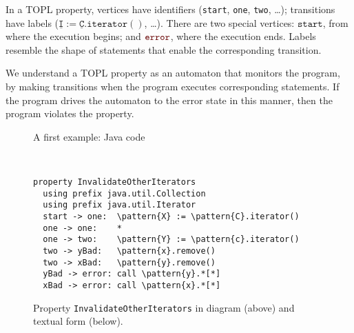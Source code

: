\documentclass[10pt, preprint]{sigplanconf} %
\newcommand{\error}{\ensuremath{\textcolor{darkred}{\mathtt{error}}}\xspace}
\newcommand{\pattern}[1]{\ensuremath{\mathtt{\underline{#1}}}}
\newcommand{\start}{\ensuremath{\mathtt{start}}\xspace}
\begin{document}
In a TOPL property, vertices have identifiers (\texttt{start}, \texttt{one}, \texttt{two}, \dots);
transitions have labels ($\pattern I:=\pattern C.\mathtt{iterator}()$, \dots).
There are two special vertices: \start, from where the execution begins; and \error, where the execution ends.
Labels resemble the shape of statements that enable the corresponding transition.

We understand a TOPL property as an automaton that monitors the
program, by making transitions when the program executes corresponding
statements. If the program drives the automaton to the error state in
this manner, then the program violates the property.

\begin{figure}[t] %

\caption{A first example: Java code}
\label{fig:first.java}
\end{figure}
%
\begin{figure}[t]
\\[2ex]
\begin{Verbatim}[commandchars=\\\{\}]
property InvalidateOtherIterators
  using prefix java.util.Collection
  using prefix java.util.Iterator
  start -> one:  \pattern{X} := \pattern{C}.iterator()
  one -> one:    *
  one -> two:    \pattern{Y} := \pattern{c}.iterator()
  two -> yBad:   \pattern{x}.remove()
  two -> xBad:   \pattern{y}.remove()
  yBad -> error: call \pattern{y}.*[*]
  xBad -> error: call \pattern{x}.*[*]
\end{Verbatim}
\caption{Property {\tt InvalidateOtherIterators} in diagram (above) and textual form (below).
}
\label{fig:first.topl}
\end{figure}
\end{document}
